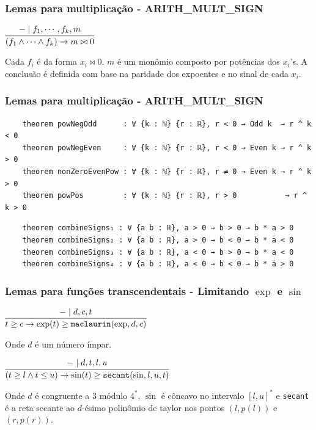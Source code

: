 \documentclass[usepdftitle=false,aspectratio=169,usenames,dvipsnames]{beamer}
\begin{document}
\begin{frame}
  \frametitle{Lemas para multiplicação - ARITH\_MULT\_SIGN}

\begin{center}
  $\infer[]{(f_{1} \land \cdots \land f_{k}) \rightarrow m \bowtie 0}{- \mid f_{1}, \cdots, f_{k}, m}$
\end{center}
Cada $f_{i}$ é da forma $x_{i} \bowtie 0$. $m$ é um monômio composto por potências dos $x_{i}$'s. A conclusão é definida com base na paridade dos expoentes e no sinal de cada $x_{i}$.
\end{frame}

\begin{frame}[fragile]
  \frametitle{Lemas para multiplicação - ARITH\_MULT\_SIGN}

  \begin{lstlisting}
    theorem powNegOdd      : ∀ {k : ℕ} {r : ℝ}, r < 0 → Odd k  → r ^ k < 0
    theorem powNegEven     : ∀ {k : ℕ} {r : ℝ}, r < 0 → Even k → r ^ k > 0
    theorem nonZeroEvenPow : ∀ {k : ℕ} {r : ℝ}, r ≠ 0 → Even k → r ^ k > 0
    theorem powPos         : ∀ {k : ℕ} {r : ℝ}, r > 0           → r ^ k > 0
  \end{lstlisting}

  \begin{lstlisting}
    theorem combineSigns₁ : ∀ {a b : ℝ}, a > 0 → b > 0 → b * a > 0
    theorem combineSigns₂ : ∀ {a b : ℝ}, a > 0 → b < 0 → b * a < 0
    theorem combineSigns₃ : ∀ {a b : ℝ}, a < 0 → b > 0 → b * a < 0
    theorem combineSigns₄ : ∀ {a b : ℝ}, a < 0 → b < 0 → b * a > 0
  \end{lstlisting}
\end{frame}

\begin{frame}[fragile]
  \frametitle{Lemas para funções transcendentais - Limitando $\exp$ e $\sin$}
\begin{center}
$\infer[]{t \geq c \rightarrow \exp(t) \geq \texttt{maclaurin}(\exp, d, c)}{- \mid d,c,t}$
\end{center}

Onde $d$ é um número ímpar.

\begin{center}
  $\infer[]{(t \geq l \wedge t \le u) \rightarrow
  \sin(t) \geq \texttt{secant}(\sin, l, u, t)}{- \mid d,t,l,u}$
\end{center}

Onde $d$ é congruente a $3$ módulo $4^{*}$, $\sin$ é côncavo no intervalo $[l, u]^{*}$ e \texttt{secant} é a reta secante ao $d$-ésimo polinômio de taylor nos pontos $(l, p(l))$ e $(r, p(r))$.

\end{frame}
\end{document}

